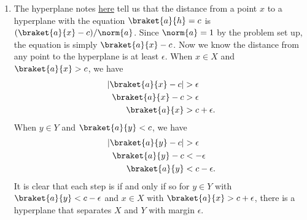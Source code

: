 \begin{enumerate}
    \item The hyperplane notes 
    \href{http://courses.washington.edu/ling572/winter2017/teaching_slides/class15_plane_intro.pdf}{here}
    tell us that the distance from a point $x$
    to a hyperplane with the equation
    $\braket{a}{h}=c$ is $(\braket{a}{x}-c)/\norm{a}$.
    Since $\norm{a}=1$ by the problem set up,
    the equation is simply $\braket{a}{x}-c$.
    Now we know the distance from any point to the
    hyperplane is at least $\epsilon$.
    When $x \in X$ and $\braket{a}{x}>c$,
    we have
    \begin{align}
        |\braket{a}{x}-c|&> \epsilon
        \nonumber \\
        \braket{a}{x}-c&> \epsilon
        \nonumber \\
        \braket{a}{x}&> c +\epsilon.
        \nonumber
    \end{align}
    When $y \in Y$ and $\braket{a}{y}<c$,
    we have
    \begin{align}
        |\braket{a}{y}-c|&> \epsilon
        \nonumber \\
        \braket{a}{y}-c&< -\epsilon
        \nonumber \\
        \braket{a}{y}&< c -\epsilon.
        \nonumber
    \end{align}
    It is clear that each step is if and only
    if so for $y \in Y$ with $\braket{a}{y}<c -\epsilon$
    and $x \in X$ with $\braket{a}{x}>c + \epsilon$,
    there is a hyperplane that separates $X$ and $Y$
    with margin $\epsilon$.


\end{enumerate}
